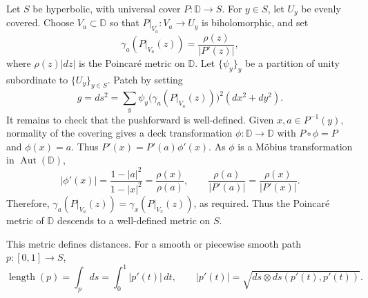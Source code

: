 \documentclass[11pt,a4paper]{article}
\begin{document}
Let $S$ be hyperbolic, with universal cover $P\colon\mathbb D\to S$. For $y\in S$, let $U_y$ be evenly covered. Choose $V_a\subset\mathbb D$ so that $P|_{V_a}\colon V_a\to U_y$ is biholomorphic, and set
\[
\gamma_a(P|_{V_a}(z))=\frac{\rho(z)}{|P'(z)|},
\]
where $\rho(z)|dz|$ is the Poincar\'e metric on $\mathbb D$. Let $\{\psi_y\}_y$ be a partition of unity subordinate to $\{U_y\}_{y\in S}$.
Patch by setting
\[
g=ds^2=\sum_y\psi_y\bigl(\gamma_a(P|_{V_a}(z))\bigr)^2(dx^2+dy^2).
\]
It remains to check that the pushforward is well-defined. Given $x,a\in P^{-1}(y)$, normality of the covering gives a deck transformation $\phi\colon\mathbb D\to\mathbb D$ with $P\circ\phi=P$ and $\phi(x)=a$. Thus $P'(x)=P'(a)\phi'(x)$. As $\phi$ is a M\"obius transformation in $\operatorname{Aut}(\mathbb D)$,
\[
|\phi'(x)|=\frac{1-|a|^2}{1-|x|^2}=\frac{\rho(x)}{\rho(a)},\qquad
\frac{\rho(a)}{|P'(a)|}=\frac{\rho(x)}{|P'(x)|}.
\]
Therefore, $\gamma_a(P|_{V_a}(z))=\gamma_x(P|_{V_x}(z))$, as required. Thus the Poincar\'e metric of $\mathbb D$ descends to a well-defined metric on $S$.

This metric defines distances. For a smooth or piecewise smooth path $p\colon[0,1]\to S$,
\[
\operatorname{length}(p)=\int_pds=\int_0^1|p'(t)|\,dt,
\qquad |p'(t)|=\sqrt{ds\otimes ds(p'(t),p'(t))}.
\]
\end{document}
